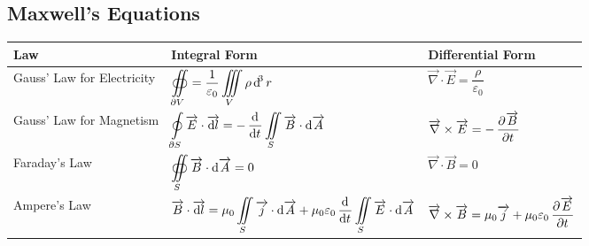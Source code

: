 \documentclass[fleqn, a4paper, 12pt, twoside]{article}
\theoremstyle{definition}
\theoremstyle{theorem}
\begin{document}
\begin{landscape}

\doublespacing

\section{Maxwell's Equations}

\begin{tabular}{|l||l|l|}
	\hline
	Law                        & Integral Form                                                                                                                                                                                                                               & Differential Form                                                                                                                \\ [1.5ex]
	\hline
	Gauss' Law for Electricity & $\displaystyle \oiint\limits_{\partial V} = \dfrac{1}{\varepsilon_0} \iiint\limits_{V} \rho \dif^3 r$                                                                                                                                       & $\overrightarrow{\nabla} \cdot \overrightarrow{E} = \dfrac{\rho}{\varepsilon_0}$                                                 \\ [1.5ex]

	Gauss' Law for Magnetism   & $\displaystyle \oint\limits_{\partial S} \overrightarrow{E} \cdot \overrightarrow{\dif l} = -\dod{}{t} \iint\limits_{S} \overrightarrow{B} \cdot \dif \overrightarrow{A}$                                                                   & $\overrightarrow{\nabla} \times \overrightarrow{E} = -\dpd{\overrightarrow{B}}{t}$                                               \\ [1.5ex]

	Faraday's Law              & $\displaystyle \oiint\limits_{S} \overrightarrow{B} \cdot \dif \overrightarrow{A} = 0$                                                                                                                                                      & $\overrightarrow{\nabla} \cdot \overrightarrow{B} = 0$                                                                           \\ [1.5ex]

	Ampere's Law               & $\displaystyle \overrightarrow{B} \cdot \overrightarrow{\dif l} = \mu_0 \iint\limits_{S} \overrightarrow{j} \cdot \dif \overrightarrow{A} + \mu_0 \varepsilon_0 \dod{}{t}\iint\limits_{S} \overrightarrow{E} \cdot \dif \overrightarrow{A}$ & $\overrightarrow{\nabla} \times \overrightarrow{B} = \mu_0 \overrightarrow{j} + \mu_0 \varepsilon_0 \dpd{\overrightarrow{E}}{t}$ \\ [1.5ex]

	\hline
\end{tabular}

\end{landscape}
\end{document}
